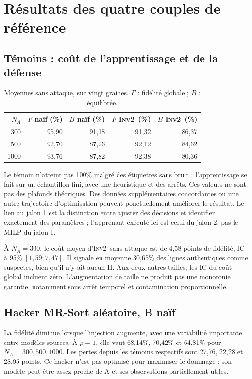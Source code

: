 \documentclass[11pt,a4paper]{article}
\newcommand{\Inv}{\textsc{Inv2}}
\begin{document}
\section{Résultats des quatre couples de référence}
\subsection{Témoins : coût de l'apprentissage et de la défense}

\begin{table}[H]\centering\small
\begin{tabular}{rrrrr}
\toprule
$N_A$ & $F$ naïf (\%) & $B$ naïf (\%) & $F$ \Inv\ (\%) & $B$ \Inv\ (\%) \\
\midrule
300 & 95,90 & 91,18 & 91,32 & 86,37 \\
500 & 92,70 & 87,26 & 92,12 & 84,62 \\
1000 & 93,76 & 87,82 & 92,38 & 80,36 \\
\bottomrule
\end{tabular}
\caption{Moyennes sans attaque, sur vingt graines. $F$ : fidélité globale ; $B$ : équilibrée.}
\label{tab:temoins}
\end{table}

Le témoin n'atteint pas 100\% malgré des étiquettes sans bruit : l'apprentissage
se fait sur un échantillon fini, avec une heuristique et des arrêts. Ces valeurs
ne sont pas des plafonds théoriques. Des données supplémentaires concordantes
ou une autre trajectoire d'optimisation peuvent ponctuellement améliorer le
résultat. Le lien au jalon 1 est la distinction entre ajuster des décisions et
identifier exactement des paramètres ; l'apprenant exécuté ici est celui du
jalon 2, pas le MILP du jalon 1.

À $N_A=300$, le coût moyen d'\Inv\ sans attaque est de 4,58 points de fidélité,
IC à 95\% $[1,59;7,47]$. Il signale en moyenne 30,65\% des lignes authentiques
comme suspectes, bien qu'il n'y ait aucun H. Aux deux autres tailles, les IC
du coût global incluent zéro. L'augmentation de taille ne produit pas une
monotonie garantie, notamment sous arrêt temporel et contamination proportionnelle.

\subsection{Hacker MR-Sort aléatoire, B naïf}

La fidélité diminue lorsque l'injection augmente, avec une variabilité importante
entre modèles sources. À $\rho=1$, elle vaut 68,14\%, 70,42\% et 64,81\% pour
$N_A=300,500,1000$. Les pertes depuis les témoins respectifs sont 27,76, 22,28
et 28,95 points. Ce hacker n'est pas optimisé pour maximiser le dommage : son
modèle peut être assez proche de A et ses observations partiellement utiles.
\end{document}
